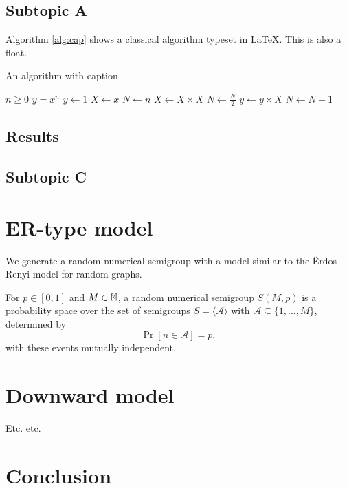 \subsection{Subtopic A}\label{sec:contrib1:theme1:A}

Algorithm \ref{alg:cap} shows a classical algorithm typeset in \LaTeX{}. This is also a float.

\begin{algorithm}
\caption{An algorithm with caption}\label{alg:cap}
\begin{algorithmic}
\Require $n \geq 0$
\Ensure $y = x^n$
\State $y \gets 1$
\State $X \gets x$
\State $N \gets n$
    \State $X \gets X \times X$
    \State $N \gets \frac{N}{2}$  
    \State $y \gets y \times X$
    \State $N \gets N - 1$
\EndIf
\EndWhile
\end{algorithmic}
\end{algorithm}

\subsection{Results}\label{sec:contrib1:theme1:B}

\subsection{Subtopic C}\label{sec:contrib1:theme1:C}

\section{ER-type model}

We generate a random numerical semigroup with a model similar to the Ërdos-Renyi model for random graphs. 

\begin{definition}
    For $p \in [0, 1]$ and $M \in \mathbb{N}$, a random numerical semigroup $S(M, p)$ is a probability space over the set of semigroups $S = \langle\mathcal{A}\rangle$ with $\mathcal{A} \subseteq \{1,...,M\}$, determined by
    \[\Pr[n \in \mathcal{A}] = p,\]
    with these events mutually independent.
\end{definition}

\section{Downward model}\label{sec:contrib1:theme2}

Etc. etc.



\section{Conclusion}
